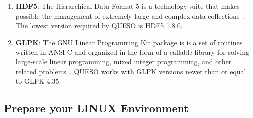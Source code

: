 \begin{enumerate}%
\item \textbf{HDF5}: The Hierarchical Data Format 5 is a technology suite that makes possible the management of extremely large and complex data collections~\cite{HDF5}. The lowest version required by QUESO is HDF5 1.8.0.

\item \textbf{GLPK}: The GNU Linear Programming Kit package is is a set of routines written in ANSI C and organized in the form of a callable library for solving large-scale linear programming, mixed integer programming, and other related problems~\cite{GLPK}. QUESO works with GLPK versions newer than or equal to  GLPK 4.35.
% 
% 

\end{enumerate}%
% 




\subsection{Prepare your LINUX Environment}\label{sec:prepare}



